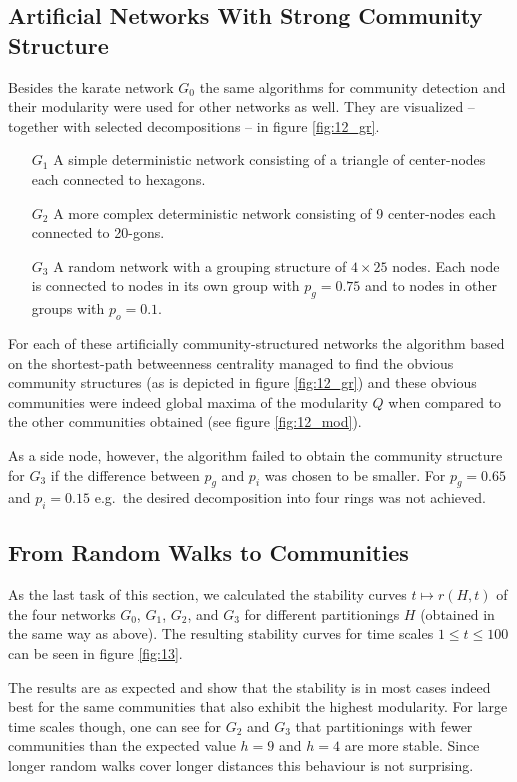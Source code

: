 \documentclass{scrartcl}
\begin{document}
\subsection{Artificial Networks With Strong Community Structure}
Besides the karate network $G_0$ the same algorithms for community
detection and their modularity were used for other networks as well.
They are visualized -- together with selected decompositions -- in figure
\ref{fig:12_gr}.
\begin{itemize}
    \item [\textbf{$G_1$}] A simple deterministic network consisting of
        a triangle of center-nodes each connected to hexagons.
    \item [\textbf{$G_2$}] A more complex deterministic network consisting
        of 9 center-nodes each connected to 20-gons.
    \item [\textbf{$G_3$}] A random network with a grouping structure of
        $4\times 25$ nodes. Each node is connected to nodes in its own
        group with $p_g=0.75$ and to nodes in other groups with $p_o
        = 0.1$.
\end{itemize}

For each of these artificially community-structured networks the
algorithm based on the shortest-path betweenness centrality managed to find
the obvious community structures (as is depicted in figure
\ref{fig:12_gr}) and these obvious communities were indeed global
maxima of the modularity $Q$ when compared to the other communities
obtained (see figure \ref{fig:12_mod}).

As a side node, however, the algorithm failed to obtain the community
structure for $G_3$ if the difference between $p_g$ and $p_i$ was chosen
to be smaller. For $p_g = 0.65$ and $p_i = 0.15$ e.g.\ the desired
decomposition into four rings was not achieved.

\subsection{From Random Walks to Communities}
As the last task of this section, we calculated the stability curves
$t\mapsto r(H, t)$ of the four networks $G_0$, $G_1$, $G_2$, and $G_3$ for
different partitionings $H$ (obtained in the same way as above). The
resulting stability curves for time scales $1\le t \le 100$ can be seen in
figure \ref{fig:13}.

The results are as expected and show that the stability is in most cases
indeed best for the same communities that also exhibit the highest
modularity. For large time scales though, one can see for $G_2$ and $G_3$ that
partitionings with fewer communities than the expected value $h = 9$ and
$h=4$ are more stable. Since longer random walks cover longer distances 
this behaviour is not surprising.
\end{document}
